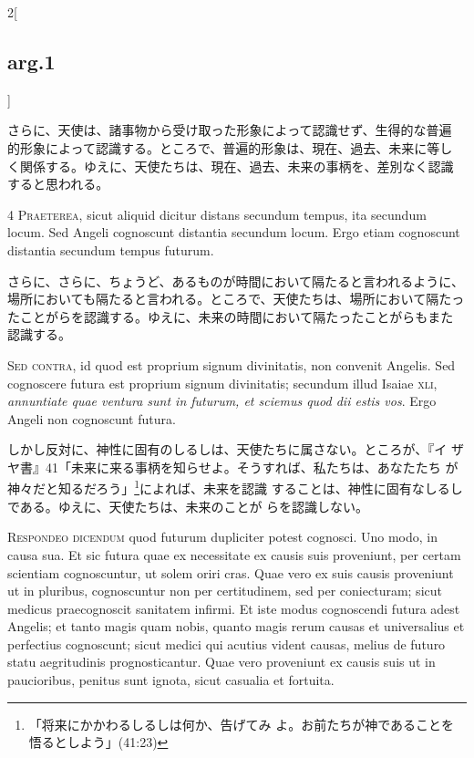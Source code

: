 \documentclass[paper=a4paper,fontsize=10pt,jafontsize=9pt,titlepage]{jlreq}
\begin{document}
\begin{paracol}{2}[\subsection{arg.1}]
\switchcolumn

さらに、天使は、諸事物から受け取った形象によって認識せず、生得的な普遍
的形象によって認識する。ところで、普遍的形象は、現在、過去、未来に等し
く関係する。ゆえに、天使たちは、現在、過去、未来の事柄を、差別なく認識
すると思われる。


{\scshape 4 Praeterea}, sicut aliquid dicitur distans secundum tempus,
ita secundum locum. Sed Angeli cognoscunt distantia secundum
locum. Ergo etiam cognoscunt distantia secundum tempus futurum.

\switchcolumn

さらに、さらに、ちょうど、あるものが時間において隔たると言われるように、
場所においても隔たると言われる。ところで、天使たちは、場所において隔たっ
たことがらを認識する。ゆえに、未来の時間において隔たったことがらもまた
認識する。

\switchcolumn*[\subsection{s.c.}]

{\scshape Sed contra}, id quod est proprium signum divinitatis, non
convenit Angelis. Sed cognoscere futura est proprium signum
divinitatis; secundum illud Isaiae {\scshape xli}, {\itshape
annuntiate quae ventura sunt in futurum, et sciemus quod dii estis
vos}. Ergo Angeli non cognoscunt futura.

\switchcolumn

しかし反対に、神性に固有のしるしは、天使たちに属さない。ところが、『イ
ザヤ書』41「未来に来る事柄を知らせよ。そうすれば、私たちは、あなたたち
が神々だと知るだろう」\footnote{「将来にかかわるしるしは何か、告げてみ
よ。お前たちが神であることを悟るとしよう」(41:23)}によれば、未来を認識
することは、神性に固有なしるしである。ゆえに、天使たちは、未来のことが
らを認識しない。


{\scshape Respondeo dicendum} quod futurum dupliciter potest
cognosci. Uno modo, in causa sua. Et sic futura quae ex necessitate ex
causis suis proveniunt, per certam scientiam cognoscuntur, ut solem
oriri cras. Quae vero ex suis causis proveniunt ut in pluribus,
cognoscuntur non per certitudinem, sed per coniecturam; sicut medicus
praecognoscit sanitatem infirmi. Et iste modus cognoscendi futura
adest Angelis; et tanto magis quam nobis, quanto magis rerum causas et
universalius et perfectius cognoscunt; sicut medici qui acutius vident
causas, melius de futuro statu aegritudinis prognosticantur. Quae vero
proveniunt ex causis suis ut in paucioribus, penitus sunt ignota,
sicut casualia et fortuita.


\end{paracol}
\end{document}
